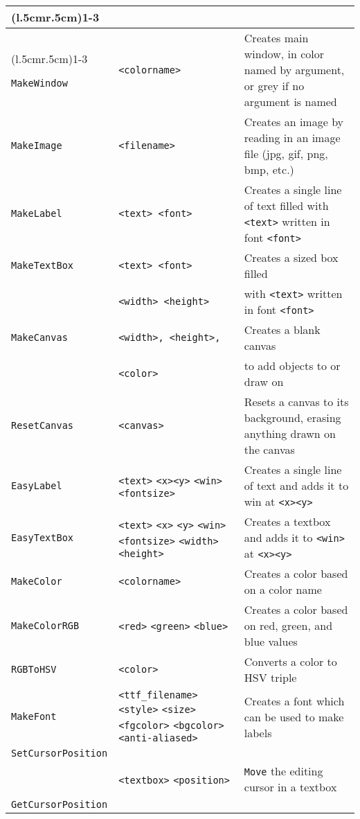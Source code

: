 \begin{longtable}{p{3cm}p{3cm}p{6cm}}
\addlinespace[0.2cm] 

\cmidrule(l{.5cm}r{.5cm}){1-3} 
\multicolumn{3}{c}{\textbf{Graphical Objects Functions}}\\ 
\cmidrule(l{.5cm}r{.5cm}){1-3} 

\verb+MakeWindow+ &\verb+<colorname>+ &Creates main window, in color named by argument, or grey if no argument is named\\ 
\verb+MakeImage+ &\verb+<filename>+ &Creates an image by reading in an image file (jpg, gif, png, bmp, etc.)\\ 
\verb+MakeLabel+ &\verb+<text> <font>+&Creates a single line of text filled with \verb+<text>+ written in font \verb+<font>+\\ 
\verb+MakeTextBox+ &\verb+<text> <font>+ &Creates a sized box filled \\ 
&\verb+<width> <height>+& with \verb+<text>+ written in font \verb+<font>+ \\ 
\verb+MakeCanvas+& \texttt{<width>, <height>,} &Creates a blank canvas\\
                  &  \texttt{<color>} &to add objects to or draw on\\
\verb+ResetCanvas+&\verb+<canvas>+&Resets a canvas to its background,
erasing anything drawn on the canvas\\
\verb+EasyLabel+ &\verb+<text>+ \verb+<x>+\verb+<y>+ \verb+<win>+\verb+<fontsize>+&Creates a single line of text and adds it to win at \verb+<x>+\verb+<y>+\\ 
\verb+EasyTextBox+ &\verb+<text>+ \verb+<x>+ \verb+<y>+ \verb+<win>+ \verb+<fontsize>+ \verb+<width>+ \verb+<height>+&Creates a textbox and adds it to \verb+<win>+ at \verb+<x>+\verb+<y>+\\ 
\verb+MakeColor+ &\verb+<colorname>+ & Creates a color based on a color name\\ 
\verb+MakeColorRGB+ &\verb+<red>+ \verb+<green>+ \verb+<blue>+ & Creates a color based on red, green, and blue values\\ 
\verb+RGBToHSV+ &\verb+<color>+ & Converts a color to HSV triple\\ 
\verb+MakeFont+ &\verb+<ttf_filename>+ \verb+<style>+ \verb+<size>+ \verb+<fgcolor>+ \verb+<bgcolor>+ \verb+<anti-aliased>+&Creates a font which can be used to make labels \\ 
\verb+SetCursorPosition+\\
   &\verb+<textbox>+ \verb+<position>+ & \verb+Move+ the editing cursor in a textbox\\ 
\verb+GetCursorPosition+\\

\end{longtable}
